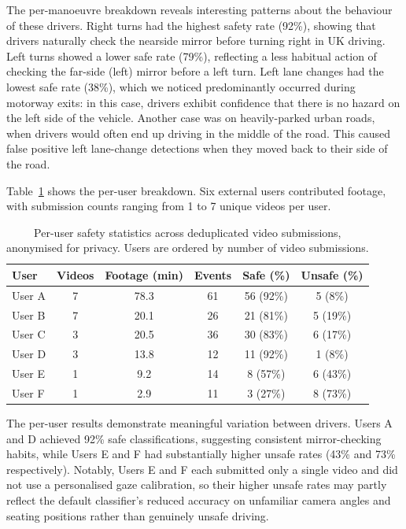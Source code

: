 \documentclass{article}
\begin{document}
The per-manoeuvre breakdown reveals interesting patterns about the behaviour of these drivers. Right turns had the highest safety rate (92\%), showing that drivers naturally check the nearside mirror before turning right in UK driving. Left turns showed a lower safe rate (79\%), reflecting a less habitual action of checking the far-side (left) mirror before a left turn. Left lane changes had the lowest safe rate (38\%), which we noticed predominantly occurred during motorway exits: in this case, drivers exhibit confidence that there is no hazard on the left side of the vehicle. Another case was on heavily-parked urban roads, when drivers would often end up driving in the middle of the road. This caused false positive left lane-change detections when they moved back to their side of the road.

Table~\ref{tab:per_user_safety} shows the per-user breakdown. Six external users contributed footage, with submission counts ranging from 1 to 7 unique videos per user.

\begin{table}[H]
\centering
\small
\begin{tabular}{|l|c|c|c|c|c|}
\hline
\textbf{User} & \textbf{Videos} & \textbf{Footage (min)} & \textbf{Events} & \textbf{Safe (\%)} & \textbf{Unsafe (\%)} \\
\hline
User A & 7 & 78.3 & 61 & 56 (92\%) & 5 (8\%) \\
User B & 7 & 20.1 & 26 & 21 (81\%) & 5 (19\%) \\
User C & 3 & 20.5 & 36 & 30 (83\%) & 6 (17\%) \\
User D & 3 & 13.8 & 12 & 11 (92\%) & 1 (8\%) \\
User E & 1 & 9.2 & 14 & 8 (57\%) & 6 (43\%) \\
User F & 1 & 2.9 & 11 & 3 (27\%) & 8 (73\%) \\
\hline
\end{tabular}
\caption{Per-user safety statistics across deduplicated video submissions, anonymised for privacy. Users are ordered by number of video submissions.}
\label{tab:per_user_safety}
\end{table}

The per-user results demonstrate meaningful variation between drivers. Users A and D achieved 92\% safe classifications, suggesting consistent mirror-checking habits, while Users E and F had substantially higher unsafe rates (43\% and 73\% respectively). Notably, Users E and F each submitted only a single video and did not use a personalised gaze calibration, so their higher unsafe rates may partly reflect the default classifier's reduced accuracy on unfamiliar camera angles and seating positions rather than genuinely unsafe driving.
\end{document}
